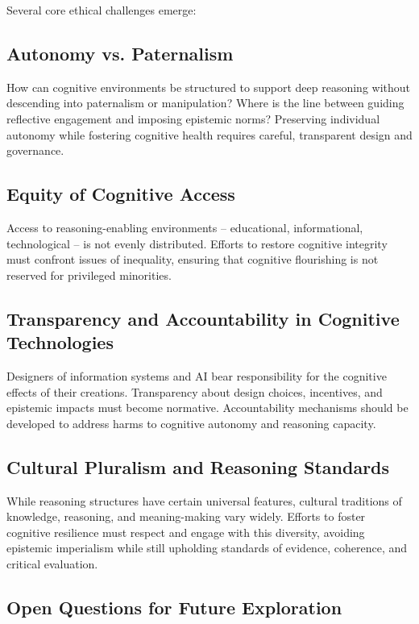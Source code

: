 Several core ethical challenges emerge:

\subsection{Autonomy vs. Paternalism}

How can cognitive environments be structured to support deep reasoning
without descending into paternalism or manipulation? Where is the line
between guiding reflective engagement and imposing epistemic norms?
Preserving individual autonomy while fostering cognitive health requires
careful, transparent design and governance.

\subsection{Equity of Cognitive Access}

Access to reasoning-enabling environments -- educational, informational,
technological -- is not evenly distributed. Efforts to restore cognitive
integrity must confront issues of inequality, ensuring that cognitive
flourishing is not reserved for privileged minorities.

\subsection{Transparency and Accountability in Cognitive Technologies}

Designers of information systems and AI bear responsibility for the
cognitive effects of their creations. Transparency about design choices,
incentives, and epistemic impacts must become normative. Accountability
mechanisms should be developed to address harms to cognitive autonomy
and reasoning capacity.

\subsection{Cultural Pluralism and Reasoning Standards}

While reasoning structures have certain universal features, cultural
traditions of knowledge, reasoning, and meaning-making vary widely.
Efforts to foster cognitive resilience must respect and engage with this
diversity, avoiding epistemic imperialism while still upholding
standards of evidence, coherence, and critical evaluation.

\subsection{Open Questions for Future Exploration}

